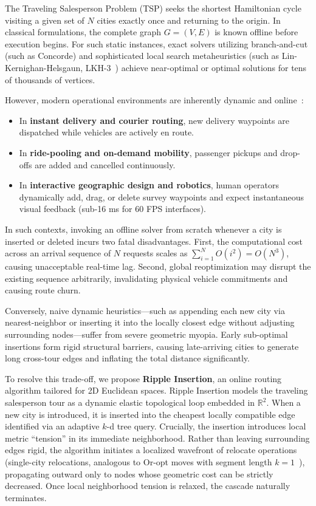 \documentclass{article}
\theoremstyle{definition}
\begin{document}
The Traveling Salesperson Problem (TSP) seeks the shortest Hamiltonian cycle visiting a given set of $N$ cities exactly once and returning to the origin. In classical formulations, the complete graph $G=(V, E)$ is known offline before execution begins. For such static instances, exact solvers utilizing branch-and-cut (such as Concorde) and sophisticated local search metaheuristics (such as Lin-Kernighan-Helsgaun, LKH-3~\cite{helsgaun2000effective, helsgaun2017extension}) achieve near-optimal or optimal solutions for tens of thousands of vertices.

However, modern operational environments are inherently dynamic and online~\cite{psaraftis1988dynamic, jaillet2008online}:
\begin{itemize}
    \item In \textbf{instant delivery and courier routing}, new delivery waypoints are dispatched while vehicles are actively en route.
    \item In \textbf{ride-pooling and on-demand mobility}, passenger pickups and drop-offs are added and cancelled continuously.
    \item In \textbf{interactive geographic design and robotics}, human operators dynamically add, drag, or delete survey waypoints and expect instantaneous visual feedback (sub-16 ms for 60 FPS interfaces).
\end{itemize}

In such contexts, invoking an offline solver from scratch whenever a city is inserted or deleted incurs two fatal disadvantages. First, the computational cost across an arrival sequence of $N$ requests scales as $\sum_{i=1}^N O(i^2) = O(N^3)$, causing unacceptable real-time lag. Second, global reoptimization may disrupt the existing sequence arbitrarily, invalidating physical vehicle commitments and causing route churn.

Conversely, naive dynamic heuristics---such as appending each new city via nearest-neighbor or inserting it into the locally closest edge without adjusting surrounding nodes---suffer from severe geometric myopia. Early sub-optimal insertions form rigid structural barriers, causing late-arriving cities to generate long cross-tour edges and inflating the total distance significantly.

To resolve this trade-off, we propose \textbf{Ripple Insertion}, an online routing algorithm tailored for 2D Euclidean spaces. Ripple Insertion models the traveling salesperson tour as a dynamic elastic topological loop embedded in $\mathbb{R}^2$. When a new city is introduced, it is inserted into the cheapest locally compatible edge identified via an adaptive $k$-d tree query. Crucially, the insertion introduces local metric ``tension'' in its immediate neighborhood. Rather than leaving surrounding edges rigid, the algorithm initiates a localized wavefront of relocate operations (single-city relocations, analogous to Or-opt moves with segment length $k=1$~\cite{or1976traveling}), propagating outward only to nodes whose geometric cost can be strictly decreased. Once local neighborhood tension is relaxed, the cascade naturally terminates.
\end{document}

